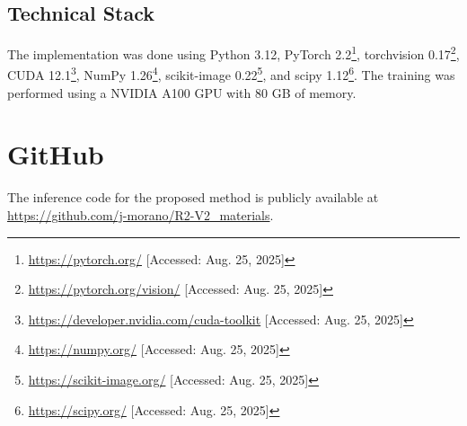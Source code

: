 \documentclass{article}
\begin{document}
\subsection{Technical Stack}

The implementation was done using Python 3.12, PyTorch 2.2\footnote{\url{https://pytorch.org/} [Accessed: Aug. 25, 2025]}, torchvision 0.17\footnote{\url{https://pytorch.org/vision/} [Accessed: Aug. 25, 2025]}, CUDA 12.1\footnote{\url{https://developer.nvidia.com/cuda-toolkit} [Accessed: Aug. 25, 2025]}, NumPy 1.26\footnote{\url{https://numpy.org/} [Accessed: Aug. 25, 2025]}, scikit-image 0.22\footnote{\url{https://scikit-image.org/} [Accessed: Aug. 25, 2025]}, and scipy 1.12\footnote{\url{https://scipy.org/} [Accessed: Aug. 25, 2025]}.
The training was performed using a NVIDIA A100 GPU with 80 GB of memory.


\section{GitHub}

The inference code for the proposed method is publicly available at \url{https://github.com/j-morano/R2-V2_materials}.


\printbibliography[title={\refname},heading=bibintoc]
\end{document}

